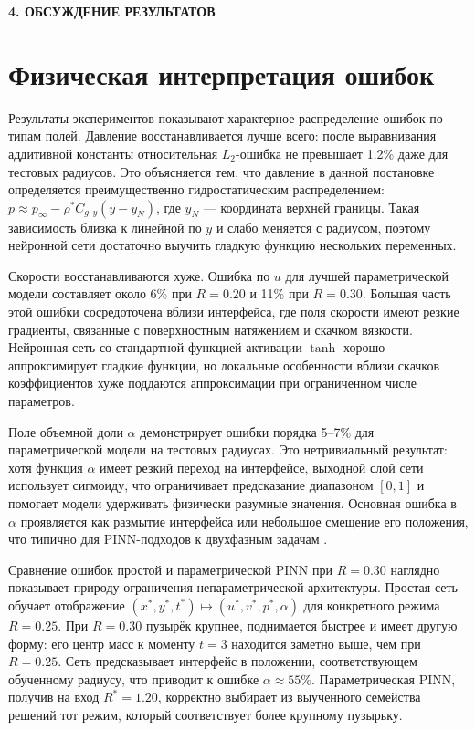 \newpage
\begin{center}
  \textbf{\large 4. ОБСУЖДЕНИЕ РЕЗУЛЬТАТОВ}
\end{center}

\section{Физическая интерпретация ошибок}

Результаты экспериментов показывают характерное распределение ошибок по типам
полей. Давление восстанавливается лучше всего: после выравнивания аддитивной
константы относительная \(L_2\)-ошибка не превышает 1.2\% даже для тестовых
радиусов. Это объясняется тем, что давление в данной постановке определяется
преимущественно гидростатическим распределением: \(p \approx p_\infty - \rho^*
C_{g,y}(y - y_N)\), где \(y_N\) --- координата верхней границы. Такая зависимость
близка к линейной по \(y\) и слабо меняется с радиусом, поэтому нейронной сети
достаточно выучить гладкую функцию нескольких переменных.

Скорости восстанавливаются хуже. Ошибка по \(u\) для лучшей параметрической
модели составляет около 6\% при \(R=0.20\) и 11\% при \(R=0.30\). Большая часть
этой ошибки сосредоточена вблизи интерфейса, где поля скорости имеют резкие
градиенты, связанные с поверхностным натяжением и скачком вязкости. Нейронная
сеть со стандартной функцией активации \(\tanh\) хорошо аппроксимирует гладкие
функции, но локальные особенности вблизи скачков коэффициентов хуже поддаются
аппроксимации при ограниченном числе параметров.

Поле объемной доли \(\alpha\) демонстрирует ошибки порядка 5--7\% для
параметрической модели на тестовых радиусах. Это нетривиальный результат: хотя
функция \(\alpha\) имеет резкий переход на интерфейсе, выходной слой сети
использует сигмоиду, что ограничивает предсказание диапазоном \([0,1]\) и
помогает модели удерживать физически разумные значения. Основная ошибка в
\(\alpha\) проявляется как размытие интерфейса или небольшое смещение его
положения, что типично для PINN-подходов к двухфазным задачам
\cite{Buhendwa2021}.

Сравнение ошибок простой и параметрической PINN при \(R=0.30\) наглядно
показывает природу ограничения непараметрической архитектуры. Простая сеть
обучает отображение \((x^*,y^*,t^*)\mapsto(u^*,v^*,p^*,\alpha)\) для конкретного
режима \(R=0.25\). При \(R=0.30\) пузырёк крупнее, поднимается быстрее и имеет
другую форму: его центр масс к моменту \(t=3\) находится заметно выше, чем при
\(R=0.25\). Сеть предсказывает интерфейс в положении, соответствующем обученному
радиусу, что приводит к ошибке \(\alpha \approx 55\%\). Параметрическая PINN,
получив на вход \(R^*=1.20\), корректно выбирает из выученного семейства решений
тот режим, который соответствует более крупному пузырьку.

